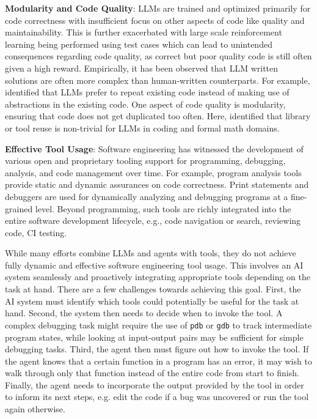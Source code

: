 \textbf{Modularity and Code Quality}: %
LLMs are trained and optimized primarily for code correctness with insufficient focus on other aspects of code like quality and maintainability. This is further exacerbated with large scale reinforcement learning being performed using test cases which can lead to unintended consequences regarding code quality, as correct but poor quality code is still often given a high reward.
Empirically, it has been observed that LLM written solutions are often more complex than human-written counterparts. 
For example, \citet{jain2024r2e} identified that LLMs prefer to repeat existing code instead of making use of abstractions in the existing code. 
One aspect of code quality is modularity, ensuring that code does not get duplicated too often. Here, \citet{berlot2024library} identified that library or tool reuse is non-trivial for LLMs in coding and formal math domains. 

\textbf{Effective Tool Usage}: Software engineering has witnessed the development of various open and proprietary tooling support for programming, debugging, analysis, and code management over time.
For example, program analysis tools provide static and dynamic assurances on code correctness. 
Print statements and debuggers are used for dynamically analyzing and debugging programs at a fine-grained level.
Beyond programming, such tools are richly integrated into the entire software development lifecycle, e.g., code navigation or search, reviewing code, CI testing.

While many efforts combine LLMs and agents with tools, they do not achieve fully dynamic and effective software engineering tool usage. This involves an AI system seamlessly and proactively integrating appropriate tools depending on the task at hand. There are a few challenges towards achieving this goal. First, the AI system must identify which tools could potentially be useful for the task at hand. Second, the system then needs to decide when to invoke the tool. A complex debugging task might require the use of \texttt{pdb} or \texttt{gdb} to track intermediate program states, while looking at input-output pairs may be sufficient for simple debugging tasks. Third, the agent then must figure out how to invoke the tool. If the agent knows that a certain function in a program has an error, it may wish to walk through only that function instead of the entire code from start to finish. Finally, the agent needs to incorporate the output provided by the tool in order to inform its next steps, e.g. edit the code if a bug was uncovered or run the tool again otherwise.


